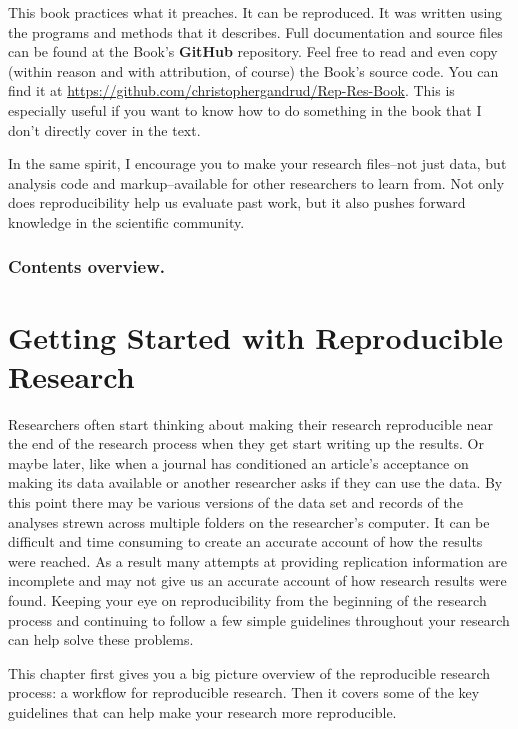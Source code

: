 \documentclass[ChapterTOCs,krantz1]{krantz}\usepackage{graphicx, color}
\begin{document}
This book practices what it preaches. It can be reproduced. It was written using the programs and methods that it describes. Full documentation and source files can be found at the Book's \textbf{GitHub} repository. Feel free to read and even copy (within reason and with attribution, of course) the Book's source code. You can find it at \url{https://github.com/christophergandrud/Rep-Res-Book}. This is especially useful if you want to know how to do something in the book that I don't directly cover in the text.

In the same spirit, I encourage you to make your research files--not just data, but analysis code and markup--available for other researchers to learn from. Not only does reproducibility help us evaluate past work, but it also pushes forward knowledge in the scientific community.

\subsection{Contents overview.}





\chapter{Getting Started with Reproducible Research}\label{GettingStarted}

Researchers often start thinking about making their research reproducible near the end of the research process when they get start writing up the results. Or maybe later, like when a journal has conditioned an article's acceptance on making its data available or another researcher asks if they can use the data. By this point there may be various versions of the data set and records of the analyses strewn across multiple folders on the researcher's computer. It can be difficult and time consuming to create an accurate account of how the results were reached. As a result many attempts at providing replication information are incomplete and may not give us an accurate account of how research results were found. Keeping your eye on reproducibility from the beginning of the research process and continuing to follow a few simple guidelines throughout your research can help solve these problems. 

This chapter first gives you a big picture overview of the reproducible research process: a workflow for reproducible research. Then it covers some of the key guidelines that can help make your research more reproducible.
\end{document}
